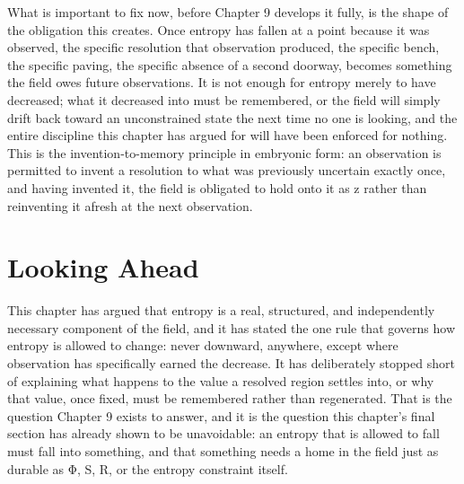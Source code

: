 What is important to fix now, before Chapter 9 develops it fully, is the shape of the obligation this creates. Once entropy has fallen at a point because it was observed, the specific resolution that observation produced, the specific bench, the specific paving, the specific absence of a second doorway, becomes something the field owes future observations. It is not enough for entropy merely to have decreased; what it decreased into must be remembered, or the field will simply drift back toward an unconstrained state the next time no one is looking, and the entire discipline this chapter has argued for will have been enforced for nothing. This is the invention-to-memory principle in embryonic form: an observation is permitted to invent a resolution to what was previously uncertain exactly once, and having invented it, the field is obligated to hold onto it as z rather than reinventing it afresh at the next observation.

\section{Looking Ahead}

This chapter has argued that entropy is a real, structured, and independently necessary component of the field, and it has stated the one rule that governs how entropy is allowed to change: never downward, anywhere, except where observation has specifically earned the decrease. It has deliberately stopped short of explaining what happens to the value a resolved region settles into, or why that value, once fixed, must be remembered rather than regenerated. That is the question Chapter 9 exists to answer, and it is the question this chapter's final section has already shown to be unavoidable: an entropy that is allowed to fall must fall into something, and that something needs a home in the field just as durable as Φ, S, R, or the entropy constraint itself.
